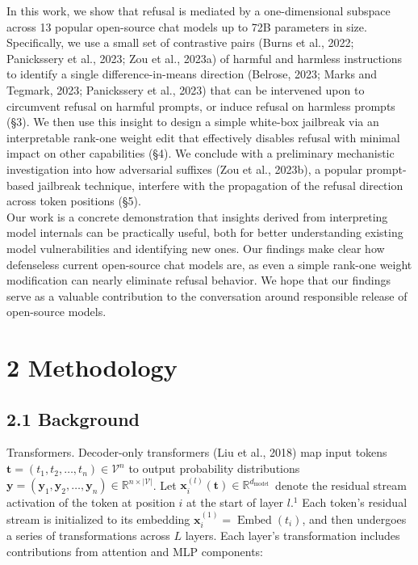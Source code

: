 \documentclass[10pt]{article}
\begin{document}
In this work, we show that refusal is mediated by a one-dimensional subspace across 13 popular open-source chat models up to 72B parameters in size. Specifically, we use a small set of contrastive pairs (Burns et al., 2022; Panickssery et al., 2023; Zou et al., 2023a) of harmful and harmless instructions to identify a single difference-in-means direction (Belrose, 2023; Marks and Tegmark, 2023; Panickssery et al., 2023) that can be intervened upon to circumvent refusal on harmful prompts, or induce refusal on harmless prompts (§3). We then use this insight to design a simple white-box jailbreak via an interpretable rank-one weight edit that effectively disables refusal with minimal impact on other capabilities (§4). We conclude with a preliminary mechanistic investigation into how adversarial suffixes (Zou et al., 2023b), a popular prompt-based jailbreak technique, interfere with the propagation of the refusal direction across token positions (§5).\\
Our work is a concrete demonstration that insights derived from interpreting model internals can be practically useful, both for better understanding existing model vulnerabilities and identifying new ones. Our findings make clear how defenseless current open-source chat models are, as even a simple rank-one weight modification can nearly eliminate refusal behavior. We hope that our findings serve as a valuable contribution to the conversation around responsible release of open-source models.

\section*{2 Methodology}
\subsection*{2.1 Background}
Transformers. Decoder-only transformers (Liu et al., 2018) map input tokens $\mathbf{t}= \left(t_{1}, t_{2}, \ldots, t_{n}\right) \in \mathcal{V}^{n}$ to output probability distributions $\mathbf{y}=\left(\mathbf{y}_{1}, \mathbf{y}_{2}, \ldots, \mathbf{y}_{n}\right) \in \mathbb{R}^{n \times|\mathcal{V}|}$. Let $\mathbf{x}_{i}^{(l)}(\mathbf{t}) \in \mathbb{R}^{d_{\text {model }}}$ denote the residual stream activation of the token at position $i$ at the start of layer $l .{ }^{1}$ Each token's residual stream is initialized to its embedding $\mathbf{x}_{i}^{(1)}=\operatorname{Embed}\left(t_{i}\right)$, and then undergoes a series of transformations across $L$ layers. Each layer's transformation includes contributions from attention and MLP components:
\end{document}

